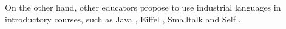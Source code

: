 On the other hand, other educators propose to use industrial languages in introductory courses, such as Java \cite{kolling2001guidelines}, Eiffel \cite{meyer1993towards, broy_outside-method_2003}, Smalltalk \cite{ducasse2006squeak} and Self \cite{Unga87a}.


